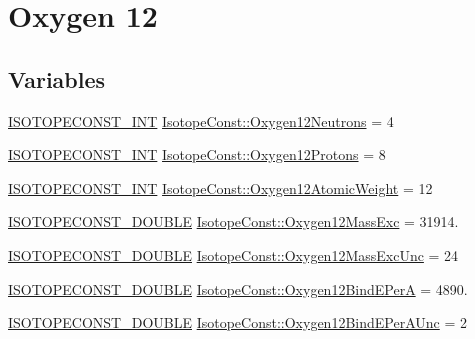 \hypertarget{group___isotope_const-_oxygen-_o12}{}\section{Oxygen 12}
\label{group___isotope_const-_oxygen-_o12}
\subsection*{Variables}
\begin{DoxyCompactItemize}
\item 
\mbox{\hyperlink{group___isotope_const-_macros_ga5f18360b3e99483a35c32d789e62621c}{I\+S\+O\+T\+O\+P\+E\+C\+O\+N\+S\+T\+\_\+\+I\+NT}} \mbox{\hyperlink{group___isotope_const-_oxygen-_o12_ga37957bd5470cf6b683cfb73df626dc27}{Isotope\+Const\+::\+Oxygen12\+Neutrons}} = 4
\item 
\mbox{\hyperlink{group___isotope_const-_macros_ga5f18360b3e99483a35c32d789e62621c}{I\+S\+O\+T\+O\+P\+E\+C\+O\+N\+S\+T\+\_\+\+I\+NT}} \mbox{\hyperlink{group___isotope_const-_oxygen-_o12_ga751a4c2730caf6e693045026dff13d8a}{Isotope\+Const\+::\+Oxygen12\+Protons}} = 8
\item 
\mbox{\hyperlink{group___isotope_const-_macros_ga5f18360b3e99483a35c32d789e62621c}{I\+S\+O\+T\+O\+P\+E\+C\+O\+N\+S\+T\+\_\+\+I\+NT}} \mbox{\hyperlink{group___isotope_const-_oxygen-_o12_ga20ce61352af5ca806c57f3c671ef5908}{Isotope\+Const\+::\+Oxygen12\+Atomic\+Weight}} = 12
\item 
\mbox{\hyperlink{group___isotope_const-_macros_ga8f45a7272ce02c0b4c65c44636ed719a}{I\+S\+O\+T\+O\+P\+E\+C\+O\+N\+S\+T\+\_\+\+D\+O\+U\+B\+LE}} \mbox{\hyperlink{group___isotope_const-_oxygen-_o12_ga09b6626e9fa760726753d71b9df799db}{Isotope\+Const\+::\+Oxygen12\+Mass\+Exc}} = 31914.
\item 
\mbox{\hyperlink{group___isotope_const-_macros_ga8f45a7272ce02c0b4c65c44636ed719a}{I\+S\+O\+T\+O\+P\+E\+C\+O\+N\+S\+T\+\_\+\+D\+O\+U\+B\+LE}} \mbox{\hyperlink{group___isotope_const-_oxygen-_o12_ga355757d4b6be6fbf41528f692686bd35}{Isotope\+Const\+::\+Oxygen12\+Mass\+Exc\+Unc}} = 24
\item 
\mbox{\hyperlink{group___isotope_const-_macros_ga8f45a7272ce02c0b4c65c44636ed719a}{I\+S\+O\+T\+O\+P\+E\+C\+O\+N\+S\+T\+\_\+\+D\+O\+U\+B\+LE}} \mbox{\hyperlink{group___isotope_const-_oxygen-_o12_ga1c01452fffc3f96c61d0624be1b5b833}{Isotope\+Const\+::\+Oxygen12\+Bind\+E\+PerA}} = 4890.
\item 
\mbox{\hyperlink{group___isotope_const-_macros_ga8f45a7272ce02c0b4c65c44636ed719a}{I\+S\+O\+T\+O\+P\+E\+C\+O\+N\+S\+T\+\_\+\+D\+O\+U\+B\+LE}} \mbox{\hyperlink{group___isotope_const-_oxygen-_o12_ga000f30d09152296c8fd6e27354aacb29}{Isotope\+Const\+::\+Oxygen12\+Bind\+E\+Per\+A\+Unc}} = 2

\end{DoxyCompactItemize}
